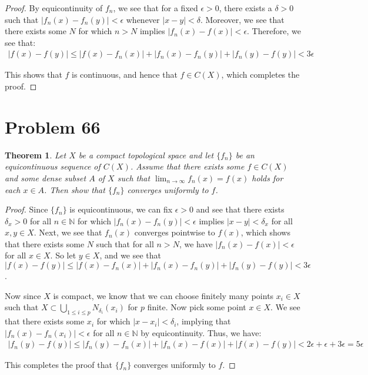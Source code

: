 \documentclass[psamsfonts]{amsart}
\newtheorem{thm}{Theorem}[section]
\theoremstyle{definition}
\theoremstyle{remark}
\numberwithin{equation}{section}
\begin{document}
\begin{proof}
By equicontinuity of $f_n$, we see that for a fixed $\epsilon > 0$, there exists a $\delta > 0$ such that $|f_n(x) - f_n(y)| < \epsilon$ whenever $|x-y| < \delta$. Moreover, we see that there exists some $N$ for which $n > N$ implies $|f_n(x) - f(x) | <\epsilon$. Therefore, we see that:
\begin{eqnarray}
|f(x) - f(y)| \leq | f(x) - f_n(x)| + |f_n(x) - f_n(y)| + |f_n(y) - f(y)| < 3 \epsilon 
\end{eqnarray}

This shows that $f$ is continuous, and hence that $f \in C(X)$, which completes the proof. 
\end{proof}

\section{Problem 66}

\begin{thm}
Let $X$ be a compact topological space and let $\{ f_n \}$ be an equicontinuous sequence of $C(X)$. Assume that there exists some $f \in C(X)$ and some dense subset $A$ of $X$ such that $\lim_{n \to \infty} f_n(x) = f(x)$ holds for each $x \in A$. Then show that $\{ f_n \}$ converges uniformly to $f$. 
\end{thm}

\begin{proof}
Since $\{ f_n \}$ is equicontinuous, we can fix $\epsilon > 0$ and see that there exists $\delta_x > 0$ for all $n \in \mathbb{N}$ for which $|f_n(x) - f_n(y) | < \epsilon$ implies $|x-y| < \delta_x $ for all $x,y \in X$. Next, we see that $f_n(x)$ converges pointwise to $f(x)$, which shows that there exists some $N$ such that for all $n > N$, we have $|f_n(x) - f(x)| < \epsilon$ for all $x \in X$. So let $y \in X$, and we see that $|f(x) - f(y)| \leq |f(x) - f_n(x)| + |f_n(x) - f_n(y)| + |f_n(y) - f(y)| < 3 \epsilon$. 

Now since $X$ is compact, we know that we can choose finitely many points $x_i \in X$ such that $X \subset \bigcup_{1 \leq i \leq p} N_{\delta_i} (x_i) $ for $p$ finite. Now pick some point $x \in X$. We see that there exists some $x_i$ for which $|x - x_i| < \delta_i$, implying that $|f_n(x) - f_n(x_i)| < \epsilon$ for all $n \in \mathbb{N}$ by equicontinuity. Thus, we have:
\begin{eqnarray}
|f_n(y) - f(y)| \leq |f_n(y) - f_n(x)| + |f_n(x) - f(x)| + |f(x) - f(y)| < 2 \epsilon + \epsilon + 3 \epsilon = 5 \epsilon
\end{eqnarray}

This completes the proof that $\{ f_n \}$ converges uniformly to $f$. 
\end{proof}
\end{document}
